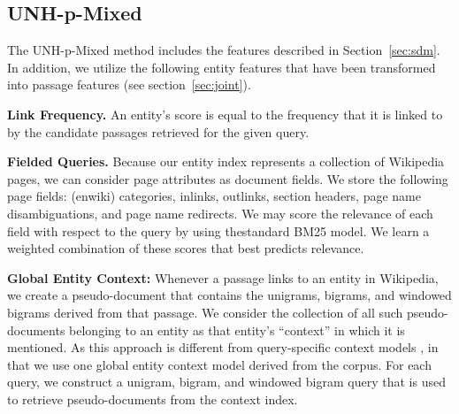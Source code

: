 \documentclass{article}
\begin{document}












\subsection{UNH-p-Mixed}\label{sec:pmixed}

The UNH-p-Mixed method includes the features described in Section~\ref{sec:sdm}. 
In addition, we utilize the following entity features that have been transformed into passage features (see section~\ref{sec:joint}).

\textbf{Link Frequency. } An entity's score is equal to the frequency that it is linked to by the candidate passages retrieved for the given query. 

\textbf{Fielded Queries.} Because our entity index represents a collection of Wikipedia pages, we can consider page attributes as document fields. We store the following page fields: (enwiki) categories, inlinks, outlinks, section headers, page name disambiguations, and page name redirects. We may score the relevance of each field with respect to the query by using thestandard BM25 model. We learn a weighted combination of these scores that best predicts relevance.

\textbf{Global Entity Context:} Whenever a passage links to an entity in Wikipedia, we create a pseudo-document that contains the unigrams, bigrams, and windowed bigrams derived from that passage.  We consider the collection of all such pseudo-documents belonging to an entity as that entity's ``context'' in which it is mentioned. As this approach is different from query-specific context models  \cite{dalton2014entity}, in that we use one global entity context model derived from the corpus. For each query, we construct a unigram, bigram, and windowed bigram query that is used to retrieve pseudo-documents from the context index.
\end{document}
